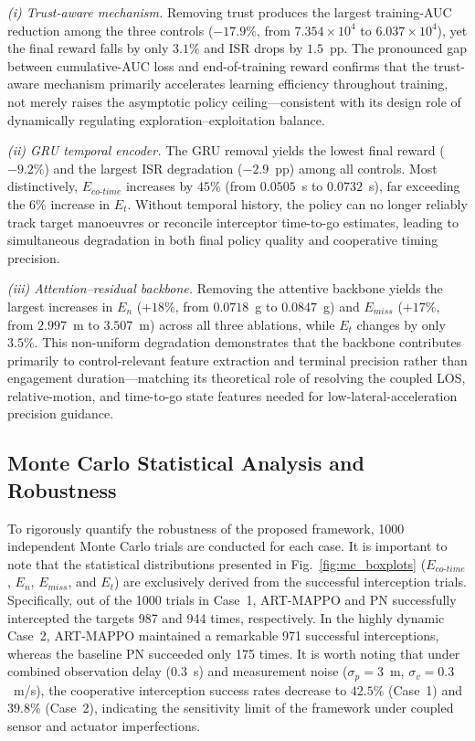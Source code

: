 \documentclass[lettersize,journal]{IEEEtran}
\newcommand{\hladd}[1]{{\color{blue}#1}}
\begin{document}
\hladd{\emph{(i) Trust-aware mechanism.}  Removing trust produces the largest training-AUC
reduction among the three controls ($-17.9\%$, from $7.354\!\times\!10^4$ to
$6.037\!\times\!10^4$), yet the final reward falls by only $3.1\%$ and ISR drops by
$1.5$~pp.  The pronounced gap between cumulative-AUC loss and end-of-training reward confirms
that the trust-aware mechanism primarily accelerates learning efficiency throughout training,
not merely raises the asymptotic policy ceiling---consistent with its design role of
dynamically regulating exploration--exploitation balance.}

\hladd{\emph{(ii) GRU temporal encoder.}  The GRU removal yields the lowest final reward
($-9.2\%$) and the largest ISR degradation ($-2.9$~pp) among all controls.  Most
distinctively, $E_{co\text{-}time}$ increases by $45\%$ (from $0.0505$~s to $0.0732$~s),
far exceeding the $6\%$ increase in $E_t$.  Without temporal history, the policy can no
longer reliably track target manoeuvres or reconcile interceptor time-to-go estimates,
leading to simultaneous degradation in both final policy quality and cooperative timing
precision.}

\hladd{\emph{(iii) Attention--residual backbone.}  Removing the attentive backbone yields the
largest increases in $E_n$ ($+18\%$, from $0.0718$~g to $0.0847$~g) and $E_{miss}$
($+17\%$, from $2.997$~m to $3.507$~m) across all three ablations, while $E_t$ changes by
only $3.5\%$.  This non-uniform degradation demonstrates that the backbone contributes
primarily to control-relevant feature extraction and terminal precision rather than
engagement duration---matching its theoretical role of resolving the coupled LOS,
relative-motion, and time-to-go state features needed for low-lateral-acceleration precision guidance.}

\subsection{Monte Carlo Statistical Analysis and Robustness}
\label{subsec:montecarlo}

To rigorously quantify the robustness of the proposed framework, 1000 independent Monte Carlo trials are conducted for each case. It is important to note that the statistical distributions presented in Fig.~\ref{fig:mc_boxplots} ($E_{co\text{-}time}$, $E_n$, $E_{miss}$, and $E_t$) are exclusively derived from the successful interception trials. Specifically, out of the 1000 trials in Case~1, ART-MAPPO and PN successfully intercepted the targets 987 and 944 times, respectively. In the highly dynamic Case~2, ART-MAPPO maintained a remarkable 971 successful interceptions, whereas the baseline PN succeeded only 175 times.
\hladd{It is worth noting that under combined observation delay ($0.3$~s) and measurement noise ($\sigma_p{=}3$~m, $\sigma_v{=}0.3$~m/s), the cooperative interception success rates decrease to $42.5\%$ (Case~1) and $39.8\%$ (Case~2), indicating the sensitivity limit of the framework under coupled sensor and actuator imperfections.}
\end{document}
